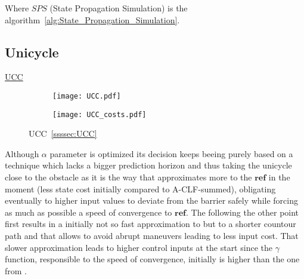 Where \(SPS\) (State Propagation Simulation) is the algorithm~\ref{alg:State_Propagation_Simulation}.\\



\subsection{Unicycle}
\label{subsec:unicycle_experiments}


\underline{UCC}
\label{ssssec:UCC_experiment} %


\begin{figure}[htbp]
  \begin{subfigure}{0.5\textwidth}
    \centering
    \texttt{[image: UCC.pdf]}
  \label{fig:UCC_CostEvol}
  \end{subfigure}
  \begin{subfigure}{0.6\textwidth}
    \centering
    \texttt{[image: UCC\_costs.pdf]}
  \label{fig:UCC_trajectory}
  \end{subfigure}
  \caption{UCC~\ref{ssssec:UCC}}
\label{fig:UCCTrajectory_and_CostEvol}
\end{figure}


Although  \(\alpha\) parameter is optimized its decision keeps beeing purely based on a  technique which lacks a bigger prediction horizon and thus taking the unicycle close to the obstacle as it is the way that approximates more to the \(\mathbf{ref}\) in the moment (less state cost initially compared to A-CLF-summed), obligating eventually to higher input values to deviate from the barrier safely while forcing as much as possible a speed of convergence to \(\mathbf{ref}\).  The  following the other point first results in a initially not so fast approximation to \txtref but to a shorter countour path and that allows to avoid abrupt maneuvers leading to less input cost. That slower approximation leads to higher control inputs at the start since the \(\gamma\) function, responsible to the speed of convergence, initially is higher than the one from . 

 \newpage %


